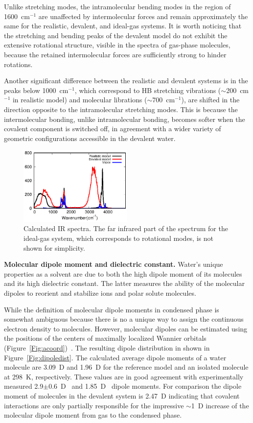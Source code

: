 \documentclass[aps,prl,reprint,amsmath,amssymb]{revtex4-1}
\begin{document}
Unlike stretching modes, the intramolecular bending modes in the region of 1600~cm$^{-1}$ are unaffected by intermolecular forces and remain approximately the same for the realistic, devalent, and ideal-gas systems. 
It is worth noticing that the stretching and bending peaks of the devalent model do not exhibit the extensive rotational structure, visible in the spectra of gas-phase molecules, because the retained intermolecular forces are sufficiently strong to hinder rotations.

Another significant difference between the realistic and devalent systems is in the peaks below 1000~cm$^{-1}$, which correspond to HB stretching vibrations ($\sim$200~cm$^{-1}$ in realistic model) and molecular librations ($\sim$700~cm$^{-1}$), are shifted in the direction opposite to the intramolecular stretching modes. This is because the intermolecular bonding, unlike intramolecular bonding, becomes softer when the covalent component is switched off, in agreement with a wider variety of geometric configurations accessible in the devalent water. 

\begin{figure}
\centering
\includegraphics[width=0.5\textwidth]{new_ir}
\caption{Calculated IR spectra. The far infrared part of the spectrum for the ideal-gas system, which corresponds to rotational modes, is not shown for simplicity. 
} \label{Fig:IR}
\end{figure}

\textbf{Molecular dipole moment and dielectric constant.} Water's unique properties as a solvent are due to both the high dipole moment of its molecules and its high dielectric constant. 
The latter measures the ability of the molecular dipoles to reorient and stabilize ions and polar solute molecules. 

While the definition of molecular dipole moments in condensed phase is somewhat ambiguous because there is no a unique way to assign the continuous electron density to molecules. 
However, molecular dipoles can be estimated using the positions of the centers of maximally localized Wannier orbitals (Figure~\ref{Fig:acoord})~\cite{marzari1997maximally,sharma2007dipolar}. 
The resulting dipole distribution in shown in Figure~\ref{Fig:dipoledist}. 
The calculated average dipole moments of a water molecule are 3.09~D and 1.96~D for the reference model and an isolated molecule at 298~K, respectively. These values are in good agreement with experimentally measured 2.9$\pm$0.6~D~\cite{badyal2000electron} and 1.85~D~\cite{haynes2014crc} dipole moments. For comparison the dipole moment of molecules in the devalent system is 2.47~D indicating that covalent interactions are only partially responsible for the impressive $\sim$1~D increase of the molecular dipole moment from gas to the condensed phase. 
\end{document}
